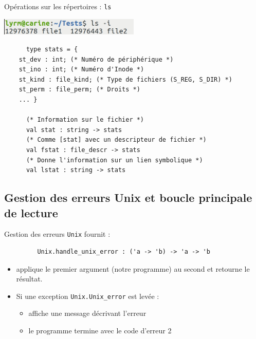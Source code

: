 \begin{frame}[fragile]{Opérations sur les répertoires : \texttt{ls}}

    \includegraphics[width=0.5\textwidth]{slides/images/shell_ls_inode.png}

    \begin{lstlisting}
      type stats = {
	st_dev : int; (* Numéro de périphérique *)
	st_ino : int; (* Numéro d'Inode *)
	st_kind : file_kind; (* Type de fichiers (S_REG, S_DIR) *)
	st_perm : file_perm; (* Droits *)
	... }

      (* Information sur le fichier *)
      val stat : string -> stats
      (* Comme [stat] avec un descripteur de fichier *)
      val fstat : file_descr -> stats
      (* Donne l'information sur un lien symbolique *)
      val lstat : string -> stats
    \end{lstlisting}

\end{frame}

\subsection{Gestion des erreurs Unix et boucle principale de lecture}

\begin{frame}[fragile]{Gestion des erreurs}
  \texttt{Unix} fournit :
    \begin{lstlisting}
         Unix.handle_unix_error : ('a -> 'b) -> 'a -> 'b
    \end{lstlisting}

    \begin{itemize}[label=]
       \item applique le premier argument (notre programme) au second
         et retourne le résultat.
       \item Si une exception \texttt{Unix.Unix\_error} est levée :
         \begin{itemize}[label=]
         \item affiche une message décrivant l'erreur
         \item le programme termine avec le code d'erreur 2
         \end{itemize}
    \end{itemize}
\end{frame}

